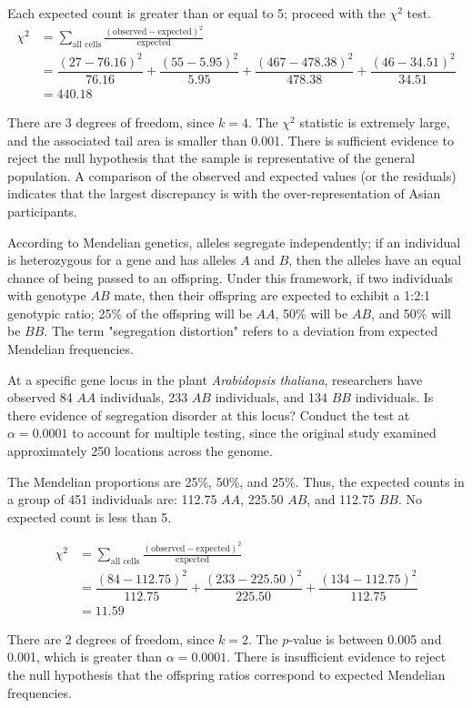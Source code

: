 \begin{example}
Each expected count is greater than or equal to 5; proceed with the $\chi^2$ test.
\begin{align*}
\chi^2 &= \sum_{\text{all cells}} \frac{(\text{observed} - \text{expected})^2}{\text{expected}} \\
&= \dfrac{(27-76.16)^2}{76.16} + \dfrac{(55-5.95)^2}{5.95} + \dfrac{(467-478.38)^2}{478.38} + \dfrac{(46-34.51)^2}{34.51} \\
&=440.18
\end{align*}	

There are 3 degrees of freedom, since $k = 4$. The $\chi^2$ statistic is extremely large, and the associated tail area is smaller than 0.001. There is sufficient evidence to reject the null hypothesis that the sample is representative of the general population. A comparison of the observed and expected values (or the residuals) indicates that the largest discrepancy is with the over-representation of Asian participants.
\end{example}


\begin{example}{According to Mendelian genetics, alleles segregate independently; if an individual is heterozygous for a gene and has alleles $A$ and $B$, then the alleles have an equal chance of being passed to an offspring. Under this framework, if two individuals with genotype $AB$ mate, then their offspring are expected to exhibit a 1:2:1 genotypic ratio; 25\% of the offspring will be $AA$, 50\% will be $AB$, and 50\% will be $BB$. The term "segregation distortion" refers to a deviation from expected Mendelian frequencies. 
		
At a specific gene locus in the plant \textit{Arabidopsis thaliana}, researchers have observed 84 $AA$ individuals, 233 $AB$ individuals, and 134 $BB$ individuals. Is there evidence of segregation disorder at this locus? Conduct the test at $\alpha = 0.0001$ to account for multiple testing, since the original study examined approximately 250 locations across the genome. 
}

The Mendelian proportions are 25\%, 50\%, and 25\%. Thus, the expected counts in a group of 451 individuals are: 112.75 $AA$, 225.50 $AB$, and 112.75 $BB$. No expected count is less than 5.

\begin{align*}
\chi^2 &= \sum_{\text{all cells}} \frac{(\text{observed} - \text{expected})^2}{\text{expected}} \\
&= \dfrac{(84-112.75)^2}{112.75} + \dfrac{(233-225.50)^2}{225.50} + \dfrac{(134-112.75)^2}{112.75}\\
&=11.59
\end{align*}

There are 2 degrees of freedom, since $k = 2$. The $p$-value is between 0.005 and 0.001, which is greater than $\alpha = 0.0001$. There is insufficient evidence to reject the null hypothesis that the offspring ratios correspond to expected Mendelian frequencies.
\end{example}

